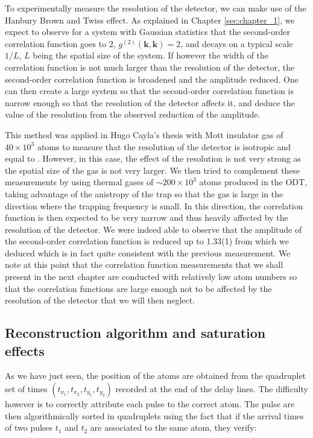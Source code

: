  To experimentally measure the resolution of the detector, we can make use of the Hanbury Brown and Twiss effect. As explained in Chapter \ref{sec:chapter_1}, we expect to observe for a system with Gaussian statistics that the second-order correlation function goes to 2, $g^{(2)} (\bm{k},\bm{k})=2$, and decays on a typical scale $1/L$, $L$ being the spatial size of the system. If however the width of the correlation function is not much larger than the resolution of the detector, the second-order correlation function is broadened and the amplitude reduced. One can then create a large system so that the second-order correlation function is narrow enough so that the resolution of the detector affects it, and deduce the value of the resolution from the observed reduction of the amplitude.
 
 This method was applied in Hugo Cayla's thesis \cite{cayla_these} with Mott insulator gas of $40 \times 10^3$ atoms to measure that the resolution of the detector is isotropic and equal to . However, in this case, the effect of the resolution is not very strong as the spatial size of the gas is not very larger. We then tried to complement these measurements by using thermal gases of $\sim 200 \times 10^3$ atoms produced in the ODT, taking advantage of the anistropy of the trap so that the gas is large in the direction where the trapping frequency is small. In this direction, the correlation function is then expected to be very narrow and thus heavily affected by the resolution of the detector. We were indeed able to observe that the amplitude of the second-order correlation function is reduced up to 1.33(1) from which we deduced  which is in fact quite consistent with the previous measurement. We note at this point that the correlation function measurements that we shall present in the next chapter are conducted with relatively low atom numbers so that the correlation functions are large enough not to be affected by the resolution of the detector that we will then neglect.


\subsection{Reconstruction algorithm and saturation effects}

As we have just seen, the position of the atoms are obtained from the quadruplet set of times $(t_{x_1},t_{x_2},t_{y_1},t_{y_2})$ recorded at the end of the delay lines. The difficulty however is to correctly attribute each pulse to the correct atom. The pulse are then algorithmically sorted in quadruplets using the fact that if the arrival times of two pulses $t_1$ and $t_2$ are associated to the same atom, they verify:

